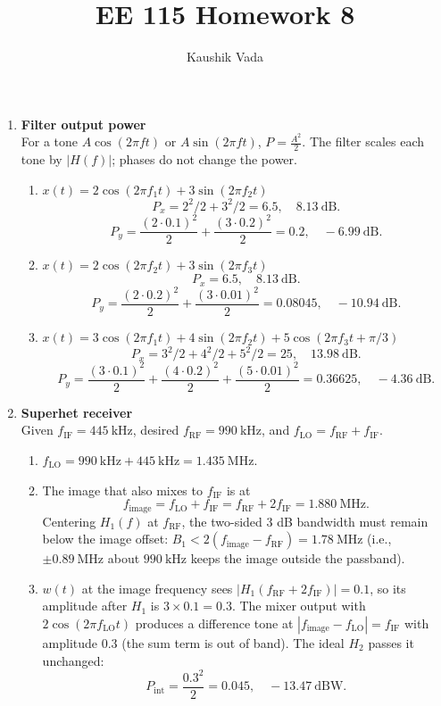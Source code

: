\documentclass[11pt]{article}
\title{EE 115 Homework 8}
\author{Kaushik Vada}
\date{}
\begin{document}
\maketitle

\begin{enumerate}
  \item \textbf{Filter output power}\\[2pt]
  For a tone $A\cos(2\pi f t)$ or $A\sin(2\pi f t)$, $P=\frac{A^{2}}{2}$. The filter scales each tone by $|H(f)|$; phases do not change the power.
  \begin{enumerate}[label = (\alph*)]
    \item $x(t)=2\cos(2\pi f_{1}t)+3\sin(2\pi f_{2}t)$\\
    \[
      P_{x}=2^{2}/2+3^{2}/2=6.5,\quad 8.13~\text{dB}.
    \]
    \[
      P_{y}=\frac{{(2\cdot0.1)}^{2}}{2}+\frac{{(3\cdot0.2)}^{2}}{2}=0.2,\quad -6.99~\text{dB}.
    \]

    \item $x(t)=2\cos(2\pi f_{2}t)+3\sin(2\pi f_{3}t)$\\
    \[
      P_{x}=6.5,\quad 8.13~\text{dB}.
    \]
    \[
      P_{y}=\frac{{(2\cdot0.2)}^{2}}{2}+\frac{{(3\cdot0.01)}^{2}}{2}=0.08045,\quad -10.94~\text{dB}.
    \]

    \item $x(t)=3\cos(2\pi f_{1}t)+4\sin(2\pi f_{2}t)+5\cos(2\pi f_{3}t+\pi/3)$\\
    \[
      P_{x}=3^{2}/2+4^{2}/2+5^{2}/2=25,\quad 13.98~\text{dB}.
    \]
    \[
      P_{y}=\frac{{(3\cdot0.1)}^{2}}{2}+\frac{{(4\cdot0.2)}^{2}}{2}+\frac{{(5\cdot0.01)}^{2}}{2}=0.36625,\quad -4.36~\text{dB}.
    \]
  \end{enumerate}

  \item \textbf{Superhet receiver}\\[2pt]
  Given $f_{\text{IF}}=445~\text{kHz}$, desired $f_{\text{RF}}=990~\text{kHz}$, and $f_{\text{LO}}=f_{\text{RF}}+f_{\text{IF}}$.
  \begin{enumerate}[label = (\alph*)]
    \item $f_{\text{LO}}=990~\text{kHz}+445~\text{kHz}=1.435~\text{MHz}$.

    \item The image that also mixes to $f_{\text{IF}}$ is at
    \[
      f_{\text{image}}=f_{\text{LO}}+f_{\text{IF}}=f_{\text{RF}}+2f_{\text{IF}}=1.880~\text{MHz}.
    \]
    Centering $H_{1}(f)$ at $f_{\text{RF}}$, the two-sided 3 dB bandwidth must remain below the image offset: $B_{1}<2(f_{\text{image}}-f_{\text{RF}})=1.78~\text{MHz}$ (i.e., $\pm0.89~\text{MHz}$ about $990~\text{kHz}$ keeps the image outside the passband).

    \item $w(t)$ at the image frequency sees $|H_{1}(f_{\text{RF}}+2f_{\text{IF}})|=0.1$, so its amplitude after $H_{1}$ is $3\times0.1=0.3$. The mixer output with $2\cos(2\pi f_{\text{LO}}t)$ produces a difference tone at $|f_{\text{image}}-f_{\text{LO}}|=f_{\text{IF}}$ with amplitude $0.3$ (the sum term is out of band). The ideal $H_{2}$ passes it unchanged:
    \[
      P_{\text{int}}=\frac{0.3^{2}}{2}=0.045,\quad -13.47~\text{dBW}.
    \]
  \end{enumerate}
\end{enumerate}
\end{document}
